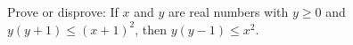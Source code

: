 Prove or disprove: If $x$ and $y$ are real numbers with $y\geq0$ and
$y(y+1) \leq (x+1)^2$, then $y(y-1)\leq x^2$.
